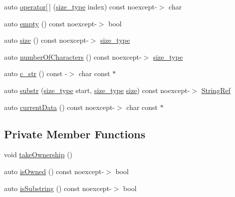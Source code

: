 \begin{DoxyCompactItemize}
\item 
auto \hyperlink{class_catch_1_1_string_ref_a803e3617331820a7ad8fea3051d6b094}{operator\mbox{[}$\,$\mbox{]}} (\hyperlink{class_catch_1_1_string_ref_a06b4db8fc82b197004291cf370b2ba7c}{size\-\_\-type} index) const noexcept-\/$>$ char
\item 
auto \hyperlink{class_catch_1_1_string_ref_a326d5d5c97e0e792d66a9056143a922b}{empty} () const noexcept-\/$>$ bool
\item 
auto \hyperlink{class_catch_1_1_string_ref_aa370158c82397f443a16f96ab3133950}{size} () const noexcept-\/$>$ \hyperlink{class_catch_1_1_string_ref_a06b4db8fc82b197004291cf370b2ba7c}{size\-\_\-type}
\item 
auto \hyperlink{class_catch_1_1_string_ref_ac1f444eb9a9c7ba18b3f71fc85f3222f}{number\-Of\-Characters} () const noexcept-\/$>$ \hyperlink{class_catch_1_1_string_ref_a06b4db8fc82b197004291cf370b2ba7c}{size\-\_\-type}
\item 
auto \hyperlink{class_catch_1_1_string_ref_a1669cb2765e820ca258159676cbd82a5}{c\-\_\-str} () const -\/$>$ char const $\ast$
\item 
auto \hyperlink{class_catch_1_1_string_ref_a7ce373cbe7068bdc118b8f0fc9a2d44d}{substr} (\hyperlink{class_catch_1_1_string_ref_a06b4db8fc82b197004291cf370b2ba7c}{size\-\_\-type} start, \hyperlink{class_catch_1_1_string_ref_a06b4db8fc82b197004291cf370b2ba7c}{size\-\_\-type} \hyperlink{class_catch_1_1_string_ref_aa370158c82397f443a16f96ab3133950}{size}) const noexcept-\/$>$ \hyperlink{class_catch_1_1_string_ref}{String\-Ref}
\item 
auto \hyperlink{class_catch_1_1_string_ref_aa8dd423c873140a92282bc7099ec67fc}{current\-Data} () const noexcept-\/$>$ char const $\ast$
\end{DoxyCompactItemize}
\subsection*{Private Member Functions}
\begin{DoxyCompactItemize}
\item 
void \hyperlink{class_catch_1_1_string_ref_aa2723bb1d9355202209993142534d3d6}{take\-Ownership} ()
\item 
auto \hyperlink{class_catch_1_1_string_ref_ac1e766daa02134c0384c71ba50ef10ef}{is\-Owned} () const noexcept-\/$>$ bool
\item 
auto \hyperlink{class_catch_1_1_string_ref_a2cc3b81f7db653f525948cc23f490880}{is\-Substring} () const noexcept-\/$>$ bool
\end{DoxyCompactItemize}
